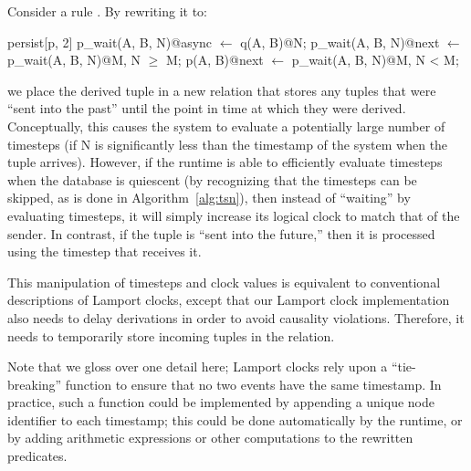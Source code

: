 Consider a rule .  By
rewriting it to:

\begin{Dedalus}
persist[p, 2]
p\_wait(A, B, N)@async \(\leftarrow\) q(A, B)@N;
p\_wait(A, B, N)@next \(\leftarrow\) p\_wait(A, B, N)@M, N \(\ge\) M;
p(A, B)@next \(\leftarrow\) p\_wait(A, B, N)@M, N < M;
\end{Dedalus}

we place the derived tuple in a new relation  that
stores any tuples that were ``sent into the past'' until the point in
time at which they were derived.  Conceptually, this causes the system
to evaluate a potentially large number of timesteps (if N is
significantly less than the timestamp of the system when the tuple
arrives).  However, if the runtime is able to efficiently evaluate
timesteps when the database is quiescent (by recognizing that the
timesteps can be skipped, as is done in Algorithm~\ref{alg:tsn}), then
instead of ``waiting'' by evaluating timesteps, it will simply
increase its logical clock to match that of the sender.  In contrast,
if the tuple is ``sent into the future,'' then it is processed using
the timestep that receives it.

This manipulation of timesteps and clock values is equivalent to
conventional descriptions of Lamport clocks, except that our Lamport
clock implementation also needs to delay derivations in order to avoid causality
violations.  Therefore, it needs to temporarily store incoming tuples
in the  relation.

Note that we gloss over one detail here; Lamport clocks rely
upon a ``tie-breaking'' function to ensure that no two events have the
same timestamp.  In practice, such a function could be implemented by
appending a unique node identifier to each timestamp; this could be
done automatically by the runtime, or by adding arithmetic expressions
or other computations to the rewritten predicates.

